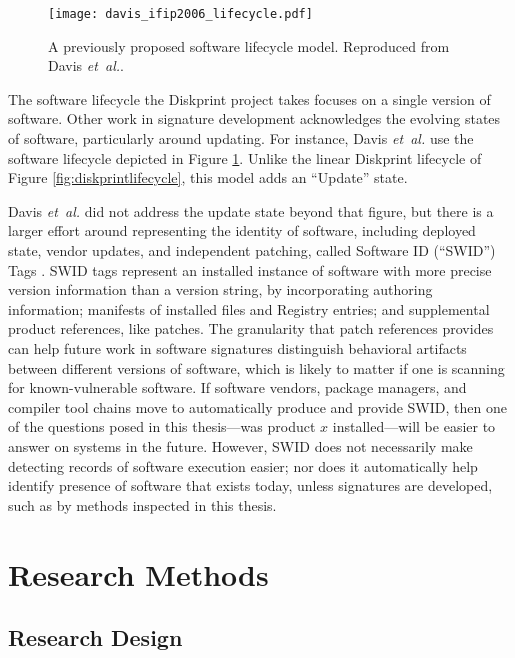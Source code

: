 \documentclass[11pt]{ucthesis}
\theoremstyle{plain}
\theoremstyle{definition}
\newcommand{\etal}{\emph{et~al.}\xspace}
\begin{document}
\begin{figure}
\begin{center}
\texttt{[image: davis\_ifip2006\_lifecycle.pdf]}
\caption{\label{fig:davis:ifip2006:lifecycle}A previously proposed software lifecycle model.  Reproduced from Davis \etal \cite{davis:ifip06}.}
\end{center}
\end{figure}

The software lifecycle the Diskprint project takes focuses on a single version of software.  Other work in signature development acknowledges the evolving states of software, particularly around updating.  For instance, Davis \etal \cite{davis:ifip06} use the software lifecycle depicted in Figure \ref{fig:davis:ifip2006:lifecycle}.  Unlike the linear Diskprint lifecycle of Figure \ref{fig:diskprintlifecycle}, this model adds an ``Update'' state.

Davis \etal did not address the update state beyond that figure, but there is a larger effort around representing the identity of software, including deployed state, vendor updates, and independent patching, called Software ID (``SWID'') Tags \cite{waltermire:nistir8060}.  SWID tags represent an installed instance of software with more precise version information than a version string, by incorporating authoring information; manifests of installed files and Registry entries; and supplemental product references, like patches.  The granularity that patch references provides can help future work in software signatures distinguish behavioral artifacts between different versions of software, which is likely to matter if one is scanning for known-vulnerable software.  If software vendors, package managers, and compiler tool chains move to automatically produce and provide SWID, then one of the questions posed in this thesis---was product $x$ installed---will be easier to answer on systems in the future.  However, SWID does not necessarily make detecting records of software execution easier; nor does it automatically help identify presence of software that exists today, unless signatures are developed, such as by methods inspected in this thesis.


\chapter{Research Methods}


\section{Research Design}
\end{document}
